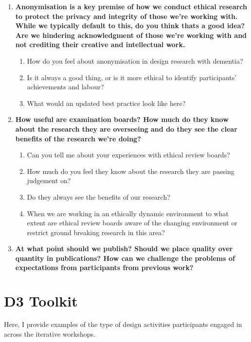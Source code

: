 \begin{enumerate}
    \item \textbf{Anonymisation is a key premise of how we conduct ethical research to protect the privacy and integrity of those we’re working with. While we typically default to this, do you think thats a good idea? Are we hindering acknowledgment of those we’re working with and not crediting their creative and intellectual work.}
    \begin{enumerate}
        \item How do you feel about anonymisation in design research with dementia?
        \item Is it always a good thing, or is it more ethical to identify participants’ achievements and labour?
        \item What would an updated best practice look like here?
    \end{enumerate}

    \item \textbf{How useful are examination boards? How much do they know about the research they are overseeing and do they see the clear benefits of the research we’re doing?}
    \begin{enumerate}
        \item Can you tell me about your experiences with ethical review boards?
        \item How much do you feel they know about the research they are passing judgement on?
        \item Do they always see the benefits of our research?
        \item When we are working in an ethically dynamic environment to what extent are ethical review boards aware of the changing environment or restrict ground breaking research in this area?
    \end{enumerate}
 
    \item \textbf{At what point should we publish? Should we place quality over quantity in publications? How can we challenge the problems of expectations from participants from previous work?}
\end{enumerate}

\chapter{D3 Toolkit}
Here, I provide examples of the type of design activities participants engaged in across the iterative workshops.

